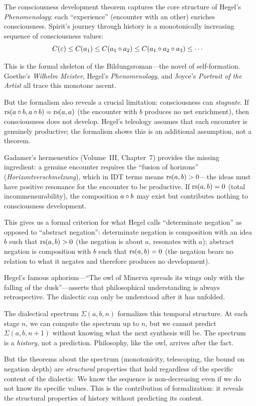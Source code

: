 \begin{interpretation}
The consciousness development theorem captures the core structure of Hegel's
\textit{Phenomenology}: each ``experience'' (encounter with an other) enriches
consciousness. Spirit's journey through history is a monotonically increasing
sequence of consciousness values:
\[
C(\varepsilon) \leq C(a_1) \leq C(a_1 \circ a_2) \leq C(a_1 \circ a_2 \circ a_3) \leq \cdots
\]

This is the formal skeleton of the Bildungsroman---the novel of self-formation.
Goethe's \textit{Wilhelm Meister}, Hegel's \textit{Phenomenology}, and
Joyce's \textit{Portrait of the Artist} all trace this monotone ascent.

But the formalism also reveals a crucial limitation: consciousness can
\emph{stagnate}. If $\mathrm{rs}(a \circ b, a \circ b) = \mathrm{rs}(a, a)$ (the
encounter with $b$ produces no net enrichment), then consciousness does not
develop. Hegel's teleology assumes that each encounter is genuinely productive;
the formalism shows this is an additional assumption, not a theorem.

Gadamer's hermeneutics (Volume~III, Chapter~7) provides the missing ingredient:
a genuine encounter requires the ``fusion of horizons'' (\textit{Horizontverschmelzung}),
which in IDT terms means $\mathrm{rs}(a, b) > 0$---the ideas must have positive
resonance for the encounter to be productive. If $\mathrm{rs}(a, b) = 0$ (total
incommensurability), the composition $a \circ b$ may exist but contributes
nothing to consciousness development.

This gives us a formal criterion for what Hegel calls ``determinate negation''
as opposed to ``abstract negation'': determinate negation is composition with
an idea $b$ such that $\mathrm{rs}(a, b) > 0$ (the negation is about $a$, resonates
with $a$); abstract negation is composition with $b$ such that $\mathrm{rs}(a, b) = 0$
(the negation bears no relation to what it negates and therefore produces
no development).
\end{interpretation}

\begin{remark}
Hegel's famous aphorism---``The owl of Minerva spreads its wings only with the
falling of the dusk''---asserts that philosophical understanding is always
retrospective. The dialectic can only be understood after it has unfolded.

The dialectical spectrum $\Sigma(a, b, n)$ formalizes this temporal structure.
At each stage $n$, we can compute the spectrum up to $n$, but we cannot predict
$\Sigma(a, b, n+1)$ without knowing what the next synthesis will be. The
spectrum is a \emph{history}, not a prediction. Philosophy, like the owl,
arrives after the fact.

But the theorems about the spectrum (monotonicity, telescoping, the bound on
negation depth) are \emph{structural} properties that hold regardless of the
specific content of the dialectic. We know the sequence is non-decreasing even
if we do not know its specific values. This is the contribution of
formalization: it reveals the structural properties of history without
predicting its content.
\end{remark}


